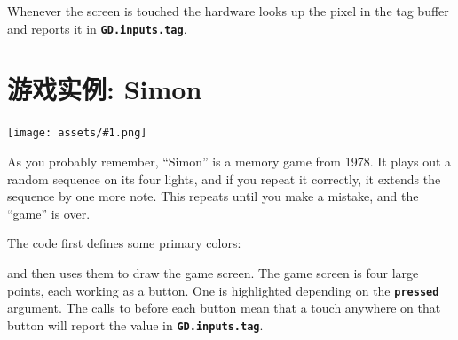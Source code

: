 \documentclass[10pt]{book}
\makeatletter
\newcommand{\png}[1]{
\begin{center}
\texttt{[image: assets/\#1.png]}
\end{center}
}
\newcommand{\mach}[1]{\texttt{\textbf{#1}}}
\newcommand{\cmdidx}[1]{
\index{#1@\mach{#1()}}
}
\newcommand{\dcmd}[1]{\cmdidx{#1}\nameref{#1}}
\makeatother
\begin{document}
\begin{CJK}{UTF8}{gkai}

\vspace{10pt}

\noindent
Whenever the screen is touched the hardware looks up the pixel in the tag buffer and reports it in
\mach{GD.inputs.tag}.

\cleartoleftpage
\section{游戏实例: Simon}
\label{simon}

\png{simon}

As you probably remember, ``Simon'' is a memory game from 1978.
It plays out a random sequence on its four lights, and if you repeat it correctly, it extends the sequence by one more note.
This repeats until you make a mistake, and the ``game'' is over.

The code first defines some primary colors:


\noindent
and then uses them to draw the game screen.
The game screen is four large points, each working as a button.
One is highlighted depending on the \mach{pressed} argument.
The calls to \dcmd{Tag} before each button mean that a touch anywhere
on that button will report the value in \mach{GD.inputs.tag}.


\end{CJK}
\end{document}
